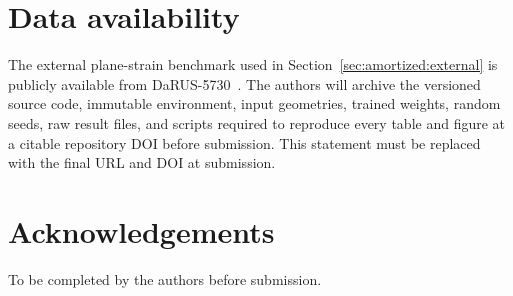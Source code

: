 \documentclass[preprint,12pt]{elsarticle}
\begin{document}
\section*{Data availability}
The external plane-strain benchmark used in Section~\ref{sec:amortized:external}
is publicly available from DaRUS-5730~\cite{Keshav2026data}. The authors
will archive the versioned source code, immutable environment,
input geometries, trained weights, random seeds, raw result files, and
scripts required to reproduce every table and figure at a citable repository
DOI before submission. This statement must be replaced with the final URL
and DOI at submission.

\section*{Acknowledgements}
To be completed by the authors before submission.



\end{document}
